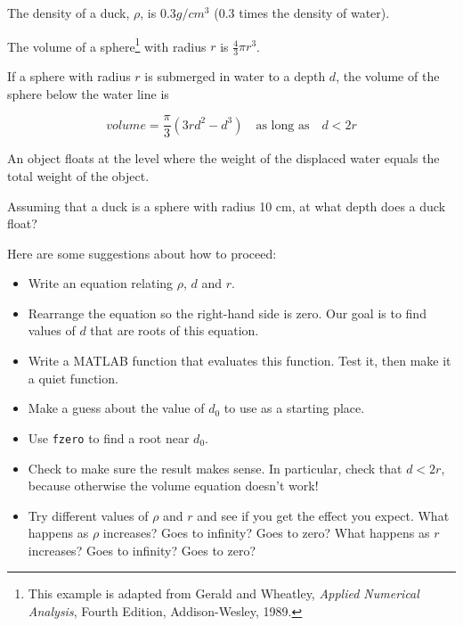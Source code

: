 \documentclass{book}
\begin{document}
\begin{ex}
\label{duck}

The density of a duck, $\rho$, is $0.3 g / cm^3$ (0.3 times the
density of water).

The volume of a sphere\footnote{This example is adapted from Gerald
and Wheatley, {\em Applied Numerical Analysis}, Fourth Edition,
Addison-Wesley, 1989.} with radius $r$ is $\frac{4}{3} \pi r^3$.

If a sphere with radius $r$ is submerged in water to a depth $d$, the
volume of the sphere below the water line is 

\[ volume = \frac{\pi}{3} (3r d^2 - d^3) \quad 
\mbox{as long as} \quad d < 2 r \]

An object floats at the level where the weight of the displaced water
equals the total weight of the object.

Assuming that a duck is a sphere with radius 10 cm, at what depth does
a duck float?

Here are some suggestions about how to proceed:

\begin{itemize}

\item Write an equation relating $\rho$, $d$ and $r$.

\item Rearrange the equation so the right-hand side is zero.
Our goal is to find values of $d$ that are roots of this equation.

\item Write a MATLAB function that evaluates this function.  Test it,
   then make it a quiet function.

\item Make a guess about the value of $d_0$ to use as a starting place.

\item Use {\tt fzero} to find a root near $d_0$.

\item Check to make sure the result makes sense.  In particular,
   check that $d < 2 r$, because otherwise the volume equation
   doesn't work!

\item Try different values of $\rho$ and $r$ and see if you get the
effect you expect.  What happens as $\rho$ increases?  Goes to
infinity?  Goes to zero?  What happens as $r$ increases?  Goes to
infinity?  Goes to zero?

\end{itemize}


\end{ex}
\end{document}
